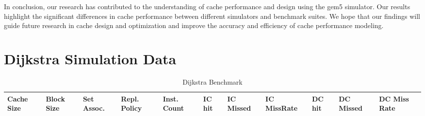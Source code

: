 \documentclass[conference]{IEEEtran}
\begin{document}
In conclusion, our research has contributed to the understanding of cache performance and design using the gem5 simulator. Our results highlight the significant differences in cache performance between different simulators and benchmark suites. We hope that our findings will guide future research in cache design and optimization and improve the accuracy and efficiency of cache performance modeling.

\printbibliography
\onecolumn

\appendix
\setcounter{section}{0}
\section{Dijkstra Simulation Data}
    \begin{table}
      \caption{Dijkstra Benchmark}
      \centering
        \begin{tabular}{|m{.75cm} |m{.75cm} |m{.8cm} | m{.75cm} | l | l | l | l | l | l | l |}
          \hline
          \textbf{Cache Size} & \textbf{ Block Size} & \textbf{Set Assoc.} & \textbf{Repl. Policy} & \textbf{Inst. Count} & \textbf{IC hit} & \textbf{IC Missed} & \textbf{IC MissRate} & \textbf{DC hit} & \textbf{DC Missed} & \textbf{DC Miss Rate} \\ \hline
          

\end{tabular}
\end{table}
\end{document}
